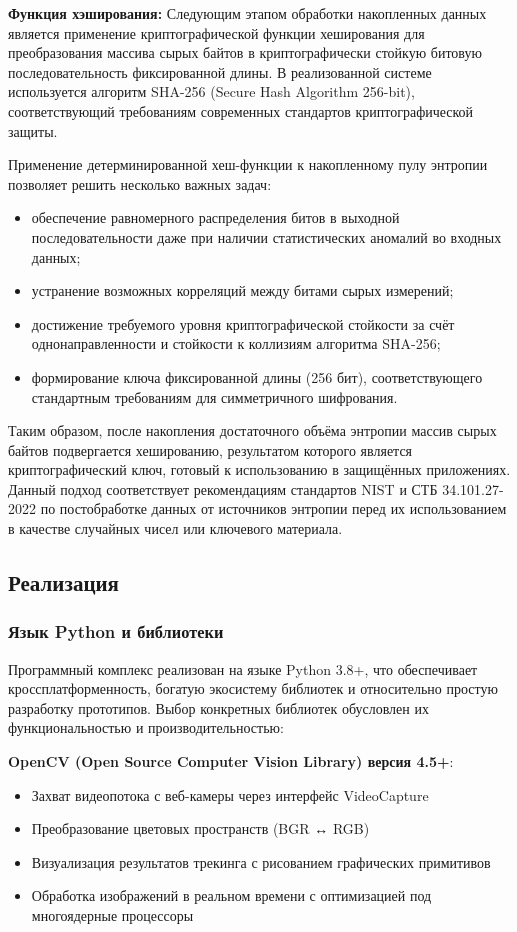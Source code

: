 \documentclass[14pt, a4paper]{extreport}
\begin{document}
\textbf{Функция хэширования:} Следующим этапом обработки накопленных данных является применение криптографической функции хеширования для преобразования массива сырых байтов в криптографически стойкую битовую последовательность фиксированной длины. В реализованной системе используется алгоритм SHA-256 (Secure Hash Algorithm 256-bit), соответствующий требованиям современных стандартов криптографической защиты. 

Применение детерминированной хеш-функции к накопленному пулу энтропии позволяет решить несколько важных задач:
\begin{itemize}
    \item обеспечение равномерного распределения битов в выходной последовательности даже при наличии статистических аномалий во входных данных;
    \item устранение возможных корреляций между битами сырых измерений;
    \item достижение требуемого уровня криптографической стойкости за счёт однонаправленности и стойкости к коллизиям алгоритма SHA-256;
    \item формирование ключа фиксированной длины (256 бит), соответствующего стандартным требованиям для симметричного шифрования.
\end{itemize}

Таким образом, после накопления достаточного объёма энтропии массив сырых байтов подвергается хешированию, результатом которого является криптографический ключ, готовый к использованию в защищённых приложениях. Данный подход соответствует рекомендациям стандартов NIST и СТБ 34.101.27-2022 по постобработке данных от источников энтропии перед их использованием в качестве случайных чисел или ключевого материала.

\subsection{Реализация}

\subsubsection{Язык Python и библиотеки}

Программный комплекс реализован на языке Python 3.8+, что обеспечивает кроссплатформенность, богатую экосистему библиотек и относительно простую разработку прототипов. Выбор конкретных библиотек обусловлен их функциональностью и производительностью:

\textbf{OpenCV (Open Source Computer Vision Library) версия 4.5+}: 
\begin{itemize}
    \item Захват видеопотока с веб-камеры через интерфейс VideoCapture
    \item Преобразование цветовых пространств (BGR ↔ RGB)
    \item Визуализация результатов трекинга с рисованием графических примитивов
    \item Обработка изображений в реальном времени с оптимизацией под многоядерные процессоры
\end{itemize}
\end{document}
